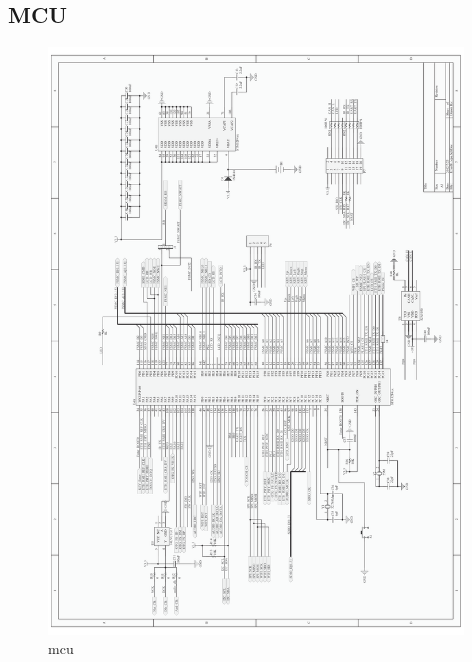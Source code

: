 \documentclass[titlepage]{article}
\begin{document}
 \newpage
 \subsection{MCU}
  \begin{figure}[h]
  \centering
 \includegraphics[width=11cm]{cpu.pdf}
  \caption{mcu}
 \end{figure}

 \newpage
\end{document}
